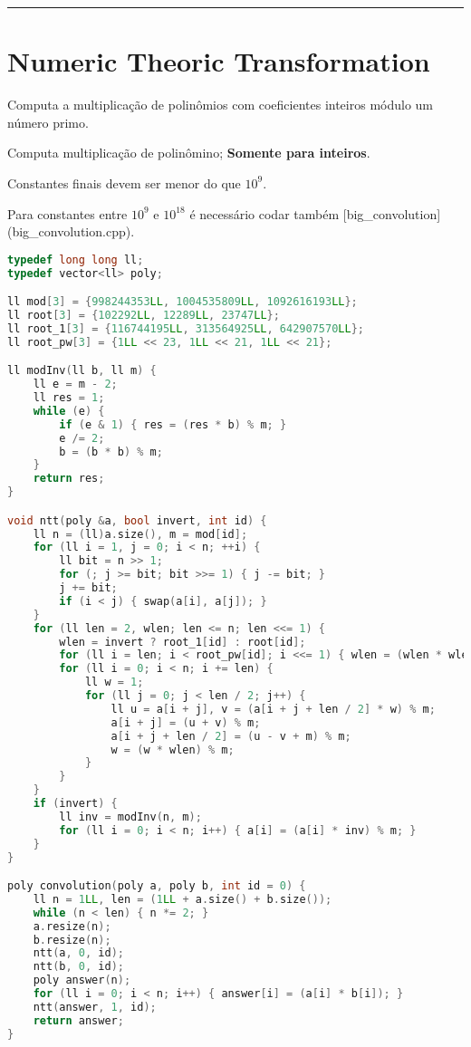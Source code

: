 \documentclass[11pt, a4paper, twoside]{book}
\begin{document}
\hfill

\rule{\textwidth}{0.4pt}

\section{Numeric Theoric Transformation}



Computa a multiplicação de polinômios com coeficientes inteiros módulo um número primo.



Computa multiplicação de polinômino; \textbf{Somente para inteiros}.





Constantes finais devem ser menor do que $10^9$.  

Para constantes entre $10^9$ e $10^{18}$ é necessário codar também [big\_convolution](big\_convolution.cpp).


\hfill

\begin{lstlisting}[language=C++]
typedef long long ll;
typedef vector<ll> poly;

ll mod[3] = {998244353LL, 1004535809LL, 1092616193LL};
ll root[3] = {102292LL, 12289LL, 23747LL};
ll root_1[3] = {116744195LL, 313564925LL, 642907570LL};
ll root_pw[3] = {1LL << 23, 1LL << 21, 1LL << 21};

ll modInv(ll b, ll m) {
    ll e = m - 2;
    ll res = 1;
    while (e) {
        if (e & 1) { res = (res * b) % m; }
        e /= 2;
        b = (b * b) % m;
    }
    return res;
}

void ntt(poly &a, bool invert, int id) {
    ll n = (ll)a.size(), m = mod[id];
    for (ll i = 1, j = 0; i < n; ++i) {
        ll bit = n >> 1;
        for (; j >= bit; bit >>= 1) { j -= bit; }
        j += bit;
        if (i < j) { swap(a[i], a[j]); }
    }
    for (ll len = 2, wlen; len <= n; len <<= 1) {
        wlen = invert ? root_1[id] : root[id];
        for (ll i = len; i < root_pw[id]; i <<= 1) { wlen = (wlen * wlen) % m; }
        for (ll i = 0; i < n; i += len) {
            ll w = 1;
            for (ll j = 0; j < len / 2; j++) {
                ll u = a[i + j], v = (a[i + j + len / 2] * w) % m;
                a[i + j] = (u + v) % m;
                a[i + j + len / 2] = (u - v + m) % m;
                w = (w * wlen) % m;
            }
        }
    }
    if (invert) {
        ll inv = modInv(n, m);
        for (ll i = 0; i < n; i++) { a[i] = (a[i] * inv) % m; }
    }
}

poly convolution(poly a, poly b, int id = 0) {
    ll n = 1LL, len = (1LL + a.size() + b.size());
    while (n < len) { n *= 2; }
    a.resize(n);
    b.resize(n);
    ntt(a, 0, id);
    ntt(b, 0, id);
    poly answer(n);
    for (ll i = 0; i < n; i++) { answer[i] = (a[i] * b[i]); }
    ntt(answer, 1, id);
    return answer;
}
\end{lstlisting}
\end{document}
